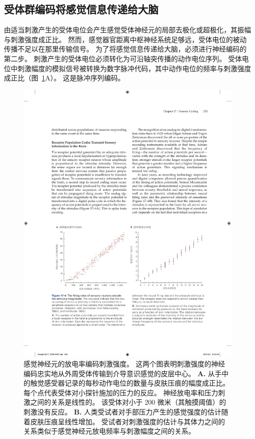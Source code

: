 \subsection{受体群编码将感觉信息传递给大脑}

由适当刺激产生的受体电位会产生感觉受体神经元的局部去极化或超极化，其振幅与刺激强度成正比。 
然而，感觉器官距离中枢神经系统足够远，受体电位的被动传播不足以在那里传输信号。 
为了将感觉信息传递给大脑，必须进行神经编码的第二步。 
刺激产生的受体电位必须转化为可沿轴突传播的动作电位序列。 
受体电位中刺激幅度的模拟信号被转换为数字脉冲代码，其中动作电位的频率与刺激强度成正比（图~\ref{fig:17_6}A）。 
这是脉冲序列编码。


\begin{figure}[htbp]
	\centering
	\includegraphics[width=1.0\linewidth]{chap17/fig_17_6}
	\caption{感觉神经元的放电率编码刺激强度。 
		这两个图表明刺激强度的神经编码忠实地从外周受体传输到介导意识感觉的皮层中心\cite{mountcastle1966neural}。
		\textbf{A.} 从手中的触觉感受器记录的每秒动作电位的数量与皮肤压痕的幅度成正比。 
		每个点代表受体对小探针施加的压力的反应。 
		神经放电率和压力刺激之间的关系是线性的。 
		该受体对小于 200 微米（其触摸阈值）的刺激没有反应。 
		\textbf{B.} 人类受试者对手部压力产生的感觉强度的估计随着皮肤压痕呈线性增加。 
		受试者对刺激强度的估计与其体力之间的关系类似于感觉神经元放电频率与刺激幅度之间的关系。}
	\label{fig:17_6}
\end{figure}



